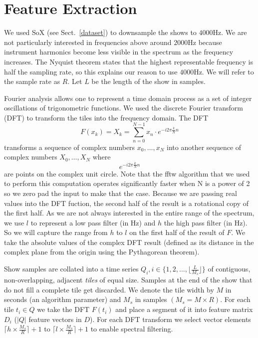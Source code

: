 \documentclass[twocolumn]{article}
\begin{document}
	\section{Feature Extraction}\label{feat_ex} %
	
	We used SoX (see Sect.~\ref{dataset}) to downsample the shows to $4000$Hz. We are not particularly interested in frequencies above around $2000$Hz because instrument harmonics become less visible in the spectrum as the frequency increases. The Nyquist theorem \cite{nyquist1928certain} states that the highest representable frequency is half the sampling rate, so this explains our reason to use $4000$Hz. We will refer to the sample rate as $R$. Let $L$ be the length of the show in samples.
	
	Fourier analysis allows one to represent a time domain process as a set of integer oscillations of trigonometric functions. We used the discrete Fourier transform (DFT) to transform the tiles into the frequency domain. The DFT 
	$$F(x_k) = X_k = \sum_{n=0}^{N-1} x_n \cdot e^{-i 2 \pi \frac{k}{N} n}$$ transforms a sequence of complex numbers $x_0,\ldots,x_N$ into another sequence of complex numbers $X_0,\ldots,X_N$ where $$e^{-i 2 \pi \frac{k}{N} n}$$ are points on the complex unit circle. Note that the fftw algorithm \cite{frigo2004fftw} that we used to perform this computation operates significantly faster when N is a power of 2 so we zero pad the input to make that the case. Because we are passing real values into the DFT fuction, the second half of the result is a rotational copy of the first half. As we are not always interested in the entire range of the spectrum, we use $l$ to represent a low pass filter (in Hz) and $h$ the high pass filter (in Hz). So we will capture the range from $h$ to $l$ on the first half of the result of $F$. We take the absolute values of the complex DFT result (defined as its distance in the complex plane from the origin using the Pythagorean theorem).
	
	Show samples are collated into a time series $Q_i, i \in \{1,2,\ldots,\lfloor\frac{L}{M_s}\rfloor\} $ of contiguous, non-overlapping, adjacent \emph{tiles} of equal size. Samples at the end of the show that do not fill a complete tile get discarded. We denote the tile width by $M$ in seconds (an algorithm parameter) and $M_s$ in samples $(M_s = M \times R)$. For each tile $t_i \in Q$ we take the DFT $F(t_i)$ and place a segment of it into feature matrix $D_i$ ($|Q|$ feature vectors in $D$). For each DFT transform we select vector elements $\lceil h \times \frac{M_s}{R} \rceil+1$ to $\lceil l \times \frac{M_s}{R} \rceil+1$ to enable spectral filtering.
	
\end{document}

